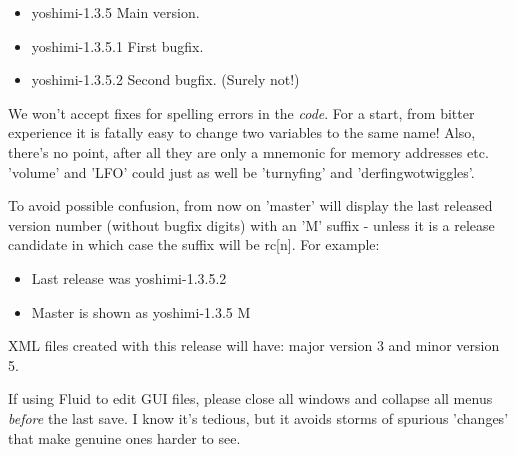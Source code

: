    \begin{itemize}
      \item yoshimi-1.3.5   Main version.
      \item yoshimi-1.3.5.1 First bugfix.
      \item yoshimi-1.3.5.2 Second bugfix. (Surely not!)
   \end{itemize}

   We won't accept fixes for spelling errors in the \textsl{code}.
   For a start, from bitter experience it is fatally easy to change two
   variables to the same name! Also, there's no point, after all they are only
   a mnemonic for memory addresses etc. 'volume' and 'LFO' could just as well
   be 'turnyfing' and 'derfingwotwiggles'.

   To avoid possible confusion, from now on 'master' will display the last
   released version number (without bugfix digits) with an 'M' suffix - unless
   it is a release candidate in which case the suffix will be rc[n].
   For example:

   \begin{itemize}
      \item Last release was yoshimi-1.3.5.2
      \item Master is shown as yoshimi-1.3.5 M
   \end{itemize}

   XML files created with this release will have: 
   major version 3 and minor version 5.

   If using Fluid to edit GUI files, please close all windows and collapse all
   menus \textsl{before} the last save.  I know it's tedious, but it avoids
   storms of spurious 'changes' that make genuine ones harder to see.


